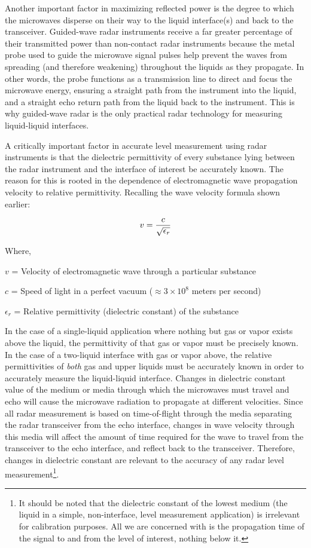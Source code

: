Another important factor in maximizing reflected power is the degree to which the microwaves disperse on their way to the liquid interface(s) and back to the transceiver.  Guided-wave radar instruments receive a far greater percentage of their transmitted power than non-contact radar instruments because the metal probe used to guide the microwave signal pulses help prevent the waves from spreading (and therefore weakening) throughout the liquids as they propagate.  In other words, the probe functions as a transmission line to direct and focus the microwave energy, ensuring a straight path from the instrument into the liquid, and a straight echo return path from the liquid back to the instrument.  This is why guided-wave radar is the only practical radar technology for measuring liquid-liquid interfaces.

\vskip 10pt

A critically important factor in accurate level measurement using radar instruments is that the dielectric permittivity of every substance lying between the radar instrument and the interface of interest be accurately known.  The reason for this is rooted in the dependence of electromagnetic wave propagation velocity to relative permittivity.  Recalling the wave velocity formula shown earlier:  

$$v = {c \over \sqrt{\epsilon_r}}$$

\noindent
Where,

$v$ = Velocity of electromagnetic wave through a particular substance

$c$ = Speed of light in a perfect vacuum ($\approx 3 \times 10^8$ meters per second)

$\epsilon_r$ = Relative permittivity (dielectric constant) of the substance

\vskip 10pt

In the case of a single-liquid application where nothing but gas or vapor exists above the liquid, the permittivity of that gas or vapor must be precisely known.  In the case of a two-liquid interface with gas or vapor above, the relative permittivities of \textit{both} gas and upper liquids must be accurately known in order to accurately measure the liquid-liquid interface.  Changes in dielectric constant value of the medium or media through which the microwaves must travel and echo will cause the microwave radiation to propagate at different velocities.  Since all radar measurement is based on time-of-flight through the media separating the radar transceiver from the echo interface, changes in wave velocity through this media will affect the amount of time required for the wave to travel from the transceiver to the echo interface, and reflect back to the transceiver.  Therefore, changes in dielectric constant are relevant to the accuracy of any radar level measurement\footnote{It should be noted that the dielectric constant of the lowest medium (the liquid in a simple, non-interface, level measurement application) is irrelevant for calibration purposes.  All we are concerned with is the propagation time of the signal to and from the level of interest, nothing below it.}.  


